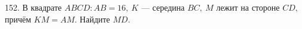 152. В квадрате $ABCD: AB=16,\ K$ --- середина $BC,\ M$ лежит на стороне $CD,$ причём $KM=AM.$ Найдите $MD.$\\
